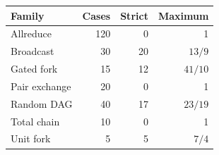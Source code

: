 \begin{tabular}{lrrr}
\toprule Family & Cases & Strict & Maximum \\
\midrule
Allreduce & 120 & 0 & 1 \\
Broadcast & 30 & 20 & $13/9$ \\
Gated fork & 15 & 12 & $41/10$ \\
Pair exchange & 20 & 0 & 1 \\
Random DAG & 40 & 17 & $23/19$ \\
Total chain & 10 & 0 & 1 \\
Unit fork & 5 & 5 & $7/4$ \\
\bottomrule
\end{tabular}

